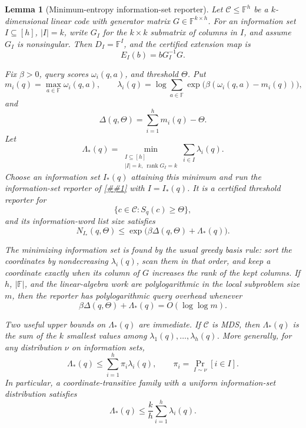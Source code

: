 \documentclass[10pt]{article}
\newcommand{\cref}[1]{\ref{##1}}
\newtheorem{lemma}[theorem]{Lemma}
\theoremstyle{definition}
\begin{document}
\begin{lemma}[Minimum-entropy information-set reporter]
   \label{lem:min-entropy-information-set}
   Let \(\mathcal C\le\mathbb F^h\) be a \(k\)-dimensional linear code with
   generator matrix \(G\in\mathbb F^{k\times h}\).  For an information set
   \(I\subseteq[h]\), \(|I|=k\), write \(G_I\) for the \(k\times k\) submatrix
   of columns in \(I\), and assume \(G_I\) is nonsingular.  Then
   \(D_I=\mathbb F^I\), and the certified extension map is
   \[
      E_I(b)=bG_I^{-1}G .
   \]

   Fix \(\beta>0\), query scores \(\omega_i(q,a)\), and threshold \(\Theta\).
   Put
   \[
      m_i(q)=\max_{a\in\mathbb F}\omega_i(q,a),
      \qquad
      \lambda_i(q)=
      \log\sum_{a\in\mathbb F}
      \exp\bigl(\beta(\omega_i(q,a)-m_i(q))\bigr),
   \]
   and
   \[
      \Delta(q,\Theta)=\sum_{i=1}^hm_i(q)-\Theta .
   \]
   Let
   \[
      \Lambda_*(q)=
      \min_{\substack{I\subseteq[h]\\ |I|=k,\ \operatorname{rank}G_I=k}}
      \sum_{i\in I}\lambda_i(q).
   \]
   Choose an information set \(I_*(q)\) attaining this minimum and run the
   information-set reporter of
   \cref{lem:information-set-threshold-reporter} with \(I=I_*(q)\).  It is a
   certified threshold reporter for
   \[
      \{c\in\mathcal C:S_q(c)\ge\Theta\},
   \]
   and its information-word list size satisfies
   \[
      N_{I_*}(q,\Theta)
      \le
      \exp\bigl(\beta\Delta(q,\Theta)+\Lambda_*(q)\bigr).
      \tag{ME1}
   \]

   The minimizing information set is found by the usual greedy basis rule:
   sort the coordinates by nondecreasing \(\lambda_i(q)\), scan them in that
   order, and keep a coordinate exactly when its column of \(G\) increases the
   rank of the kept columns.  If \(h\), \(|\mathbb F|\), and the linear-algebra
   work are polylogarithmic in the local subproblem size \(m\), then the
   reporter has polylogarithmic query overhead whenever
   \[
      \beta\Delta(q,\Theta)+\Lambda_*(q)=O(\log\log m).
      \tag{ME2}
   \]

   Two useful upper bounds on \(\Lambda_*(q)\) are immediate.  If
   \(\mathcal C\) is MDS, then \(\Lambda_*(q)\) is the sum of the \(k\)
   smallest values among \(\lambda_1(q),\ldots,\lambda_h(q)\).  More generally,
   for any distribution \(\nu\) on information sets,
   \[
      \Lambda_*(q)
      \le
      \sum_{i=1}^h \pi_i\lambda_i(q),
      \qquad
      \pi_i=\Pr_{I\sim\nu}[i\in I].
      \tag{ME3}
   \]
   In particular, a coordinate-transitive family with a uniform information-set
   distribution satisfies
   \[
      \Lambda_*(q)\le\frac{k}{h}\sum_{i=1}^h\lambda_i(q).
      \tag{ME4}
   \]
\end{lemma}
\end{document}
